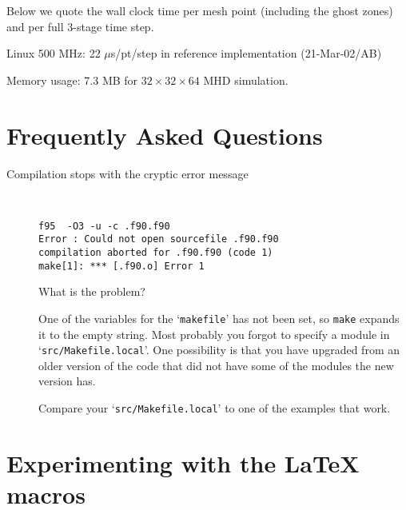 \documentclass[12pt,twoside,notitlepage,a4paper]{article}
\newcommand{\code}[1]{\texttt{#1}}
\newcommand{\file}[1]{`\texttt{#1}'}
\newcommand{\command}[1]{\code{#1}\index{#1}}
\newcommand{\cmd}[1]{\command{#1}}
\begin{document}
Below we quote the wall clock time per mesh point (including the ghost zones)
and per full 3-stage time step.

Linux 500 MHz: 22 $\mu$s/pt/step in reference implementation (21-Mar-02/AB)

Memory usage: 7.3 MB for $32\times32\times64$ MHD simulation.




\section{Frequently Asked Questions}

\begin{description}

\item[Compilation stops with the cryptic error message]{\bfseries \ 
    
    \begin{Verbatim}
f95  -O3 -u -c .f90.f90
Error : Could not open sourcefile .f90.f90
compilation aborted for .f90.f90 (code 1)
make[1]: *** [.f90.o] Error 1
    \end{Verbatim}
  
    What is the problem?}
  \medskip


  One of the variables for the \file{makefile} has not been set, so
  \cmd{make} expands it to the empty string.
  Most probably you forgot to specify a module in
  \file{src/Makefile.local}. One possibility is that you have upgraded
  from an older version of the code that did not have some of the modules
  the new version has.
  
  Compare your \file{src/Makefile.local} to one of the examples that
  work.


\end{description}



\section{Experimenting with the \LaTeX{} macros}
\end{document}
